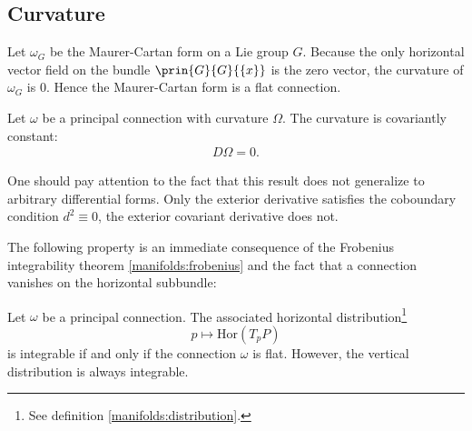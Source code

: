 \subsection{Curvature}

    \begin{example}
        Let $\omega_G$ be the Maurer-Cartan form on a Lie group $G$. Because the only horizontal vector field on the bundle $\prin{G}{G}{\{x\}}$ is the zero vector, the curvature of $\omega_G$ is 0. Hence the Maurer-Cartan form is a flat connection.
    \end{example}

    \begin{property}
        Let $\omega$ be a principal connection with curvature $\Omega$. The curvature is covariantly constant:
        \begin{gather}
            D\Omega = 0.
        \end{gather}
    \end{property}
    \begin{remark}
        One should pay attention to the fact that this result\mnote{\dbend} does not generalize to arbitrary differential forms. Only the exterior derivative satisfies the coboundary condition $d^2 \equiv 0$, the exterior covariant derivative does not.
    \end{remark}


    The following property is an immediate consequence of the Frobenius integrability theorem \ref{manifolds:frobenius} and the fact that a connection vanishes on the horizontal subbundle:
    \begin{property}
        Let $\omega$ be a principal connection. The associated horizontal distribution\footnote{See definition \ref{manifolds:distribution}.} \[p\mapsto\text{Hor}(T_pP)\] is integrable if and only if the connection $\omega$ is flat. However, the vertical distribution is always integrable.
    \end{property}

